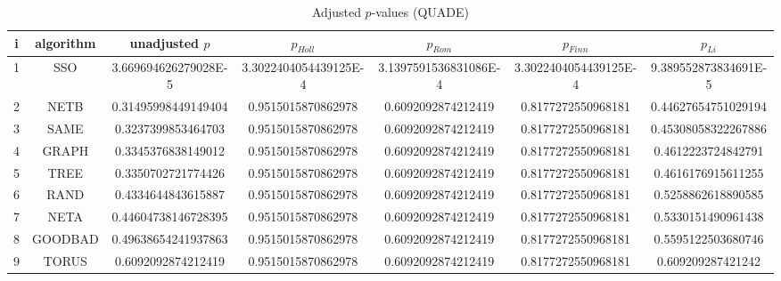 \documentclass[a4paper,10pt]{article}
\begin{document}
\begin{landscape}
\begin{table}[!htp]
\centering\scriptsize
\caption{Adjusted $p$-values (QUADE)}
\begin{tabular}{ccccccc}
i&algorithm&unadjusted $p$&$p_{Holl}$&$p_{Rom}$&$p_{Finn}$&$p_{Li}$\\
\hline
1& SSO&3.669694626279028E-5&3.3022404054439125E-4&3.1397591536831086E-4&3.3022404054439125E-4&9.389552873834691E-5\\
2& NETB&0.31495998449149404&0.9515015870862978&0.6092092874212419&0.8177272550968181&0.44627654751029194\\
3& SAME&0.3237399853464703&0.9515015870862978&0.6092092874212419&0.8177272550968181&0.45308058322267886\\
4& GRAPH&0.3345376838149012&0.9515015870862978&0.6092092874212419&0.8177272550968181&0.4612223724842791\\
5& TREE&0.3350702721774426&0.9515015870862978&0.6092092874212419&0.8177272550968181&0.4616176915611255\\
6& RAND&0.4334644843615887&0.9515015870862978&0.6092092874212419&0.8177272550968181&0.5258862618890585\\
7& NETA&0.44604738146728395&0.9515015870862978&0.6092092874212419&0.8177272550968181&0.5330151490961438\\
8& GOODBAD&0.49638654241937863&0.9515015870862978&0.6092092874212419&0.8177272550968181&0.5595122503680746\\
9& TORUS&0.6092092874212419&0.9515015870862978&0.6092092874212419&0.8177272550968181&0.609209287421242\\
\hline
\end{tabular}
\end{table}

\end{landscape}
\end{document}
